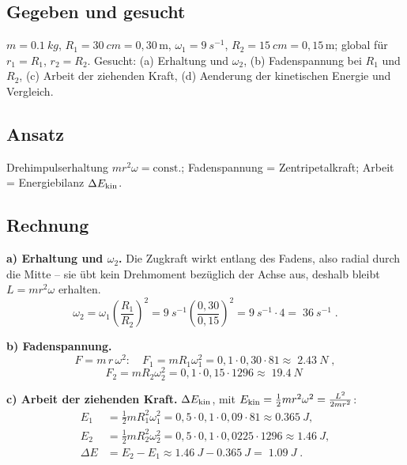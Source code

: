 
\subsection*{Gegeben und gesucht}
$m=\qty{0.1}{kg}$, $R_1=\qty{30}{cm}=0{,}30\,\mathrm m$,
$\omega_1=\qty{9}{s^{-1}}$, $R_2=\qty{15}{cm}=0{,}15\,\mathrm m$; global
f{\"u}r $r_1=R_1$, $r_2=R_2$. Gesucht: (a) Erhaltung und $\omega_2$,
(b) Fadenspannung bei $R_1$ und $R_2$, (c) Arbeit der ziehenden Kraft,
(d) Aenderung der kinetischen Energie und Vergleich.

\subsection*{Ansatz}
Drehimpulserhaltung $mr^2\omega=\text{const.}$; Fadenspannung =
Zentripetalkraft; Arbeit = Energiebilanz $\Delta E_{\rm kin}$.

\subsection*{Rechnung}
\textbf{a) Erhaltung und $\omega_2$.} Die Zugkraft wirkt entlang des
Fadens, also radial durch die Mitte -- sie übt kein Drehmoment
bezüglich der Achse aus, deshalb bleibt $L=mr^2\omega$ erhalten.
\begin{equation}
  \omega_2=\omega_1\left(\frac{R_1}{R_2}\right)^2
  =\qty{9}{s^{-1}}\left(\frac{0{,}30}{0{,}15}\right)^2
  =\qty{9}{s^{-1}}\cdot4
  =\boxed{\;\qty{36}{s^{-1}}\;}.
\end{equation}

\textbf{b) Fadenspannung.}
\begin{equation}
  F=m\,r\,\omega^2: \quad
  F_1=mR_1\omega_1^2=0{,}1\cdot0{,}30\cdot81\approx\boxed{\;\qty{2.43}{N}\;},
\end{equation}
\begin{equation}
  F_2=mR_2\omega_2^2=0{,}1\cdot0{,}15\cdot1296
  \approx\boxed{\;\qty{19.4}{N}\;}
\end{equation}

\textbf{c) Arbeit der ziehenden Kraft.} $\Delta E_{\rm kin}$, mit
$E_{\rm kin}=\tfrac12 m r^2\omega^2=\tfrac{L^2}{2mr^2}$:
\begin{align}
  E_1&=\tfrac12 m R_1^2\omega_1^2
      =0{,}5\cdot0{,}1\cdot0{,}09\cdot81\approx\qty{0.365}{J},\\
  E_2&=\tfrac12 m R_2^2\omega_2^2
      =0{,}5\cdot0{,}1\cdot0{,}0225\cdot1296\approx\qty{1.46}{J},\\
  \Delta E&=E_2-E_1\approx\qty{1.46}{J}-\qty{0.365}{J}
      =\boxed{\;\qty{1.09}{J}\;}.
\end{align}

